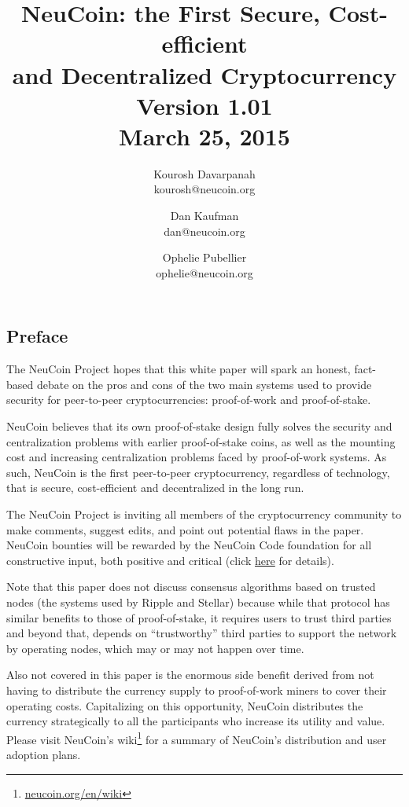 \documentclass[a4paper,11pt]{article}
\title{\vspace{-5mm}NeuCoin: the First Secure, Cost-efficient\\ and Decentralized Cryptocurrency\\
  \vspace{8mm}
  \large Version 1.01\\ March 25, 2015\vspace{3mm}}
\author{
  Kourosh Davarpanah\\
  kourosh@neucoin.org
  \and
  Dan Kaufman\\
  dan@neucoin.org
  \and
  Ophelie Pubellier\\
  ophelie@neucoin.org
\vspace{3mm}}
\date{}
\begin{document}
\maketitle 


\subsection*{Preface}

The NeuCoin Project hopes that this white paper will spark an honest, fact-based debate on the pros and cons of the two main systems used to provide security for peer-to-peer cryptocurrencies: proof-of-work and proof-of-stake. 
 
NeuCoin believes that its own proof-of-stake design fully solves the security and centralization problems with earlier proof-of-stake coins, as well as the mounting cost and increasing centralization problems faced by proof-of-work systems. As such, NeuCoin is the first peer-to-peer cryptocurrency, regardless of technology, that is secure, cost-efficient and decentralized in the long run.

The NeuCoin Project is inviting all members of the cryptocurrency community to make comments, suggest edits, and point out potential flaws in the paper. NeuCoin bounties will be rewarded by the NeuCoin Code foundation for all constructive input, both positive and critical (click \href{http://www.neucoin.org/en/whitepaper/#bounty-program}{here} for details).

Note that this paper does not discuss consensus algorithms based on trusted nodes (the systems used by Ripple and Stellar) because while that protocol has similar benefits to those of proof-of-stake, it requires users to trust third parties and beyond that, depends on “trustworthy” third parties to support the network by operating nodes, which may or may not happen over time.

Also not covered in this paper is the enormous side benefit derived from not having to distribute the currency supply to proof-of-work miners to cover their operating costs. Capitalizing on this opportunity, NeuCoin distributes the currency strategically to all the participants who increase its utility and value. Please visit NeuCoin's wiki\footnote{\href{http://www.neucoin.org/en/wiki/}{neucoin.org/en/wiki}} for a summary of NeuCoin's distribution and user adoption plans.

\newpage
\end{document}
